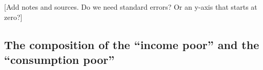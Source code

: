 [Add notes and sources. Do we need standard errors? Or an y-axis that starts at zero?]

\subsection{The composition of the ``income poor'' and the ``consumption poor''}\label{subsec:composition}



